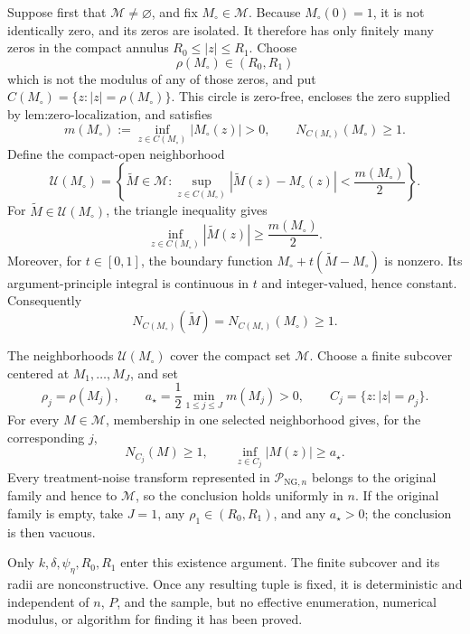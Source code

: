 Suppose first that \(\mathscr M\neq\varnothing\), and fix \(M_{\circ}\in\mathscr M\).  Because \(M_{\circ}(0)=1\), it is not identically zero, and its zeros are isolated.  It therefore has only finitely many zeros in the compact annulus \(R_0\le |z|\le R_1\).  Choose
\[
 \rho(M_{\circ})\in(R_0,R_1)
\]
which is not the modulus of any of those zeros, and put \(C(M_{\circ})=\{z:|z|=\rho(M_{\circ})\}\).  This circle is zero-free, encloses the zero supplied by \(\text{lem:zero-localization}\), and satisfies
\[
 m(M_{\circ})
 :=\inf_{z\in C(M_{\circ})}|M_{\circ}(z)|>0,
 \qquad
 N_{C(M_{\circ})}(M_{\circ})\ge1.
\]
Define the compact-open neighborhood
\[
 \mathcal U(M_{\circ})
 =\left\{\widetilde M\in\mathscr M:
 \sup_{z\in C(M_{\circ})}
 |\widetilde M(z)-M_{\circ}(z)|<\frac{m(M_{\circ})}{2}
 \right\}.
\]
For \(\widetilde M\in\mathcal U(M_{\circ})\), the triangle inequality gives
\[
 \inf_{z\in C(M_{\circ})}|\widetilde M(z)|
 \ge\frac{m(M_{\circ})}{2}.
\]
Moreover, for \(t\in[0,1]\), the boundary function \(M_{\circ}+t(\widetilde M-M_{\circ})\) is nonzero.  Its argument-principle integral is continuous in \(t\) and integer-valued, hence constant.  Consequently
\[
 N_{C(M_{\circ})}(\widetilde M)
 =N_{C(M_{\circ})}(M_{\circ})
 \ge1.
\]

The neighborhoods \(\mathcal U(M_{\circ})\) cover the compact set \(\mathscr M\).  Choose a finite subcover centered at \(M_1,\ldots,M_J\), and set
\[
 \rho_j=\rho(M_j),
 \qquad
 a_{\star}=\frac12\min_{1\le j\le J}m(M_j)>0,
 \qquad
 C_j=\{z:|z|=\rho_j\}.
\]
For every \(M\in\mathscr M\), membership in one selected neighborhood gives, for the corresponding \(j\),
\[
 N_{C_j}(M)\ge1,
 \qquad
 \inf_{z\in C_j}|M(z)|\ge a_{\star}.
\]
Every treatment-noise transform represented in \(\mathcal P_{\mathrm{NG},n}\) belongs to the original family and hence to \(\mathscr M\), so the conclusion holds uniformly in \(n\).  If the original family is empty, take \(J=1\), any \(\rho_1\in(R_0,R_1)\), and any \(a_{\star}>0\); the conclusion is then vacuous.

Only \(k,\delta,\psi_{\eta},R_0,R_1\) enter this existence argument.  The finite subcover and its radii are nonconstructive.  Once any resulting tuple is fixed, it is deterministic and independent of \(n\), \(P\), and the sample, but no effective enumeration, numerical modulus, or algorithm for finding it has been proved.